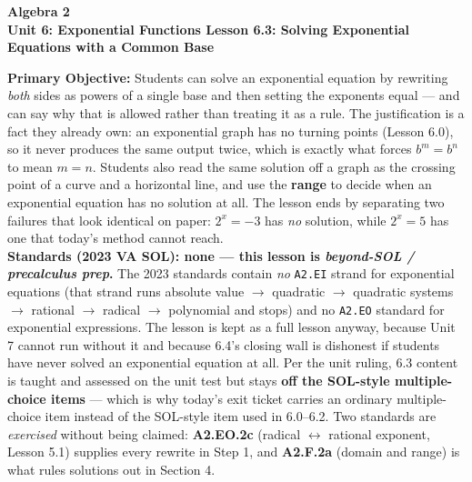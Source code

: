 \documentclass[10pt]{article}
\newcommand{\CourseName}{Algebra 2}
\newcommand{\UnitNumberName}{Unit 6: Exponential Functions \quad}
\newcommand{\LessonNumberName}{Lesson 6.3: Solving Exponential Equations with a Common Base}
\begin{document}
\begin{center}
    {\Large\bfseries \CourseName \\
    {\small\bfseries \UnitNumberName \LessonNumberName}}
\end{center}

\begin{tcolorbox}[colback=forestbg, colframe=forest, boxrule=0.9pt, arc=2mm,
    left=2mm, right=2mm, top=1.5mm, bottom=1.5mm]
    \textbf{Primary Objective:} Students can solve an exponential equation by rewriting \emph{both}
    sides as powers of a single base and then setting the exponents equal --- and can say why that is
    allowed rather than treating it as a rule. The justification is a fact they already own: an
    exponential graph has no turning points (Lesson 6.0), so it never produces the same output twice,
    which is exactly what forces $b^{m}=b^{n}$ to mean $m=n$. Students also read the same solution off
    a graph as the crossing point of a curve and a horizontal line, and use the \textbf{range} to
    decide when an exponential equation has no solution at all. The lesson ends by separating two
    failures that look identical on paper: $2^{x}=-3$ has \emph{no} solution, while $2^{x}=5$ has one
    that today's method cannot reach.
    \\[2pt]
    \textbf{Standards (2023 VA SOL): none --- this lesson is \textit{beyond-SOL / precalculus prep}.}
    The 2023 standards contain \emph{no} \texttt{A2.EI} strand for exponential equations (that strand
    runs absolute value $\to$ quadratic $\to$ quadratic systems $\to$ rational $\to$ radical $\to$
    polynomial and stops) and no \texttt{A2.EO} standard for exponential expressions. The lesson is
    kept as a full lesson anyway, because Unit 7 cannot run without it and because 6.4's closing wall
    is dishonest if students have never solved an exponential equation at all. Per the unit ruling,
    6.3 content is taught and assessed on the unit test but stays \textbf{off the SOL-style
    multiple-choice items} --- which is why today's exit ticket carries an ordinary multiple-choice
    item instead of the SOL-style item used in 6.0--6.2. Two standards are \emph{exercised} without
    being claimed: \textbf{A2.EO.2c} (radical $\leftrightarrow$ rational exponent, Lesson 5.1) supplies
    every rewrite in Step 1, and \textbf{A2.F.2a} (domain and range) is what rules solutions out in
    Section 4.
\end{tcolorbox}
\end{document}

